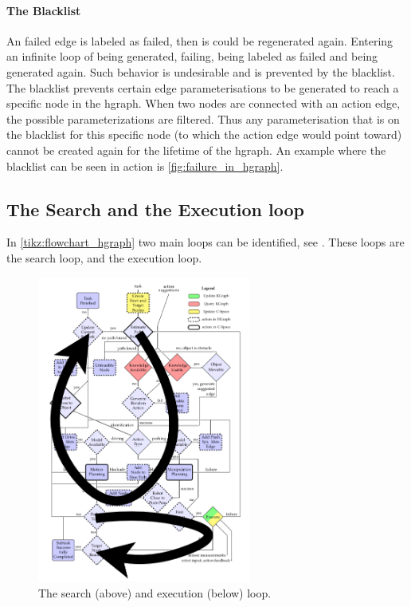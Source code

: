 \paragraph{The Blacklist}%
An failed edge is labeled as failed, then is could be regenerated again. Entering an infinite loop of being generated, failing, being labeled as failed and being generated again. Such behavior is undesirable and is prevented by the blacklist. The blacklist prevents certain edge parameterisations to be generated to reach a specific node in the \ac{hgraph}. When two nodes are connected with an action edge, the possible parameterizations are filtered. Thus any parameterisation that is on the blacklist for this specific node (to which the action edge would point toward) cannot be created again for the lifetime of the \ac{hgraph}. An example where the blacklist can be seen in action is \cref{fig:failure_in_hgraph}.\bs

\subsection{The Search and the Execution loop}%
\label{subsec:two_loops}
In \cref{tikz:flowchart_hgraph} two main loops can be identified, see . These loops are the search loop, and the execution loop.\bs

\begin{figure}[H]
    \centering
    \includegraphics[width=7cm]{figures/two_loops_identified}
    \caption{The search (above) and execution (below) loop.}%
    \label{fig:two_loops_identified}
\end{figure}

